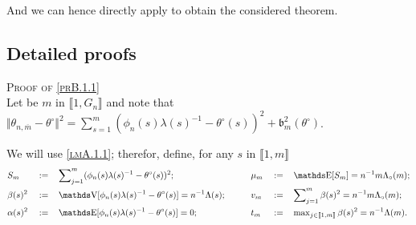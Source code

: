 And we can hence directly apply  to obtain the considered theorem.

\subsection{Detailed proofs}
\begin{pro}{\textsc{Proof of \textsc{\cref{prB.1.1}}} \\}\label{proB.1.1}
Let be $m$ in $\llbracket 1, G_{n} \rrbracket$ and note that $\Vert \theta_{n, \overline{m}} - \theta^{\circ} \Vert^{2} = \sum\nolimits_{s = 1}^{m} (\phi_{n}(s)\lambda(s)^{-1} - \theta^{\circ}(s))^{2} + \mathfrak{b}_{m}^{2}(\theta^{\circ})$.

We will use \textsc{\cref{lmA.1.1}}; therefor, define, for any $s$ in $\llbracket 1, m \rrbracket$
\begin{alignat*}{7}
& S_{m} &&:=&& \sum\nolimits_{j = 1}^{m} (\phi_{n}(s) \lambda(s)^{-1} - \theta^{\circ}(s))^{2}; \quad && && \mu_{m}&&:=&&\E[S_{m}] = n^{-1}m \Lambda_{\circ}(m); \\
& \beta(s)^{2} &&:=&& \V[\phi_{n}(s) \lambda(s)^{-1} - \theta^{\circ}(s)] = n^{-1} \Lambda(s); \quad && && v_{m} &&:=&& \sum\nolimits_{j = 1}^{m}\beta(s)^{2} = n^{-1} m \Lambda_{\circ}(m);\\
& \alpha(s)^{2} &&:=&& \E[\phi_{n}(s) \lambda(s)^{-1} - \theta^{\circ}(s)] = 0; && && t_{m} &&:=&& \max\nolimits_{j \in \llbracket 1, m \rrbracket}\beta(s)^{2} = n^{-1} \Lambda(m).
\end{alignat*}


\end{pro}
